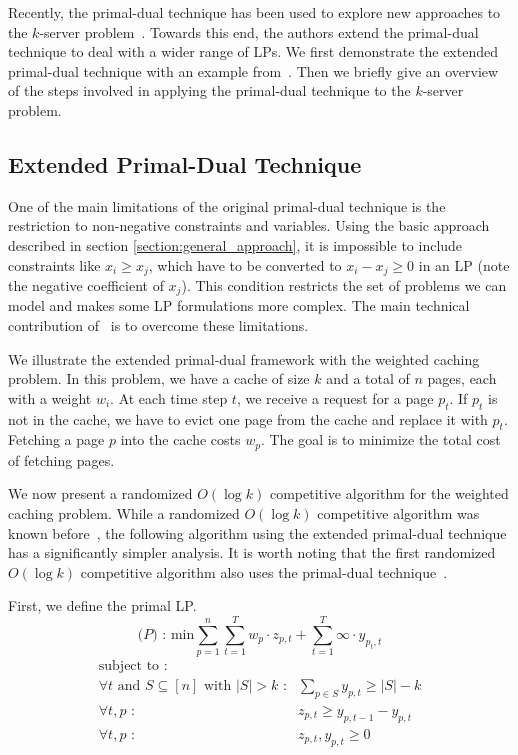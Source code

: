 Recently, the primal-dual technique has been used to explore new approaches to the $k$-server problem~\cite{bansal10:k-server}.
Towards this end, the authors extend the primal-dual technique to deal with a wider range of LPs.
We first demonstrate the extended primal-dual technique with an example from~\cite{bansal10:k-server}.
Then we briefly give an overview of the steps involved in applying the primal-dual technique to the $k$-server problem.

\subsection{Extended Primal-Dual Technique}
One of the main limitations of the original primal-dual technique is the restriction to non-negative constraints and variables.
Using the basic approach described in section \ref{section:general_approach}, it is impossible to include constraints like $x_i \geq x_j$, which have to be converted to $x_i - x_j \geq 0$ in an LP (note the negative coefficient of $x_j$).
This condition restricts the set of problems we can model and makes some LP formulations more complex.
The main technical contribution of~\cite{bansal10:k-server} is to overcome these limitations.

We illustrate the extended primal-dual framework with the weighted caching problem.
In this problem, we have a cache of size $k$ and a total of $n$ pages, each with a weight $w_i$.
At each time step $t$, we receive a request for a page $p_t$.
If $p_t$ is not in the cache, we have to evict one page from the cache and replace it with $p_t$.
Fetching a page $p$ into the cache costs $w_p$.
The goal is to minimize the total cost of fetching pages.

We now present a randomized $O(\log k)$ competitive algorithm for the weighted caching problem.
While a randomized $O(\log k)$ competitive algorithm was known before~\cite{bansal10:k-server}, the following algorithm using the extended primal-dual technique has a significantly simpler analysis.
It is worth noting that the first randomized $O(\log k)$ competitive algorithm also uses the primal-dual technique~\cite{bansal07:weighted-paging}.

First, we define the primal LP.
\[
\textrm{($P$) : min}  \sum_{p=1}^n\sum_{t=1}^T w_p \cdot z_{p,t} + \sum_{t=1}^T \infty \cdot y_{p_t,t}
\]
\[
	\begin{array}{rr}
	\textrm{subject to :} & \\
		\forall t \textrm{ and } S \subseteq [n] \textrm{ with }|S| > k \textrm{ :} & \sum_{p\in S} y_{p,t} \geq |S| - k \\
		\forall t,p \textrm{ :} & z_{p,t} \geq y_{p,t-1} - y_{p,t} \\
		\forall t,p \textrm{ :} & z_{p,t}, y_{p,t} \geq 0 \\
	\end{array}
\]

